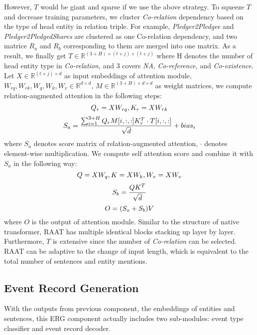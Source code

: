 \documentclass[11pt]{article}
\begin{document}
However, $T$ would be giant and sparse if we use the above strategy. To squeeze $T$ and decrease training parameters, we cluster \textit{Co-relation}  dependency based on the type of head entity in relation triple. For example, \textit{Pledger2Pledgee} and \textit{Pledger2PledgedShares} are clustered as one Co-relation dependency, and two matrice $R_a$ and $R_b$ corresponding to them are merged into one matrix. As a result, we finally get $T \in \mathbb{R}^{(3 + H) \times (t+j) \times (t + j)}$ where H denotes the number of head entity type in \textit{Co-relation}, and 3 covers \textit{NA}, \textit{Co-reference}, and \textit{Co-existence}.
Let $X \in \mathbb{R}^{(t+j) \times d}$ as input embeddings of attention module, $W_{rq}, W_{rk}, W_q, W_k, W_v \in \mathbb{R}^{d \times d}$, $M \in \mathbb{R}^{(3 + H) \times d \times d}$ as weight matrices,  we compute relation-augmented attention in the following steps:
\begin{equation}
\small
    Q_r=XW_{rq}, K_r=XW_{rk}
\end{equation}
\begin{equation}
\small
    S_a = \frac{\sum_{i=1}^{3+H} Q_rM[i, :, :]K^T_r \cdot T[i,:,:]}{\sqrt{d}} + bias_i
\end{equation}
where $S_a$ denotes score matrix of relation-augmented attention, $\cdot$ denotes element-wise multiplication. We compute self attention score and combine it with $S_a$ in the following way:
\begin{equation}
\small
    Q=XW_q, K=XW_k, W_v = XW_v
\end{equation}
\begin{equation}
\small
    S_b = \frac{QK^T}{\sqrt{d}}
\end{equation}
\begin{equation}
\small
    O = (S_a + S_b)V
\end{equation}
where $O$ is the output of attention module. Similar to the structure of native transformer, RAAT has multiple identical blocks stacking up layer by layer. Furthermore, $T$ is extensive since the number of \textit{Co-relation} can be selected. RAAT can be adaptive to the change of input length, which is equivalent to the total number of sentences and entity mentions.

\subsection{Event Record Generation}

With the outputs from previous component, the embeddings of entities and sentences, this ERG component actually includes two sub-modules: event type classifier and event record decoder.
\end{document}
